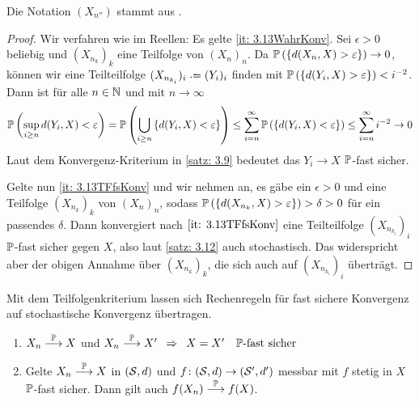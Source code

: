 Die Notation $(X_{n''})$ stammt aus \cite{billingsley2008probability}.

\begin{proof}
	Wir verfahren wie im Reellen:
	Es gelte \cref{it: 3.13WahrKonv}. Sei $\epsilon > 0$ beliebig und $(X_{n_k})_k$ eine Teilfolge von $(X_n)_n$.
	Da $\P\brackets{\menge{d(X_n, X) > \epsilon}} \to 0$, können wir eine Teilteilfolge $(X_{n_{k_i}})_i \defeq (Y_i)_i$ finden mit $\P\brackets{\menge{d(Y_i, X) > \epsilon}} < i^{-2}$. Dann ist für alle $n \in \N$ und mit $n \to \infty$
	\begin{align*}
		\P\brackets{\sup_{i \ge n} d(Y_i, X) < \epsilon}
		= \P\brackets{\bigcup_{i \ge n} \menge{d(Y_i, X) < \epsilon}}
		\leq \sum_{i = n}^{\infty} \P\brackets{\menge{d(Y_i, X) < \epsilon}}
		\leq \sum_{i = n}^{\infty} i^{-2} \to 0 
	\end{align*}
	Laut dem Konvergenz-Kriterium in \cref{satz: 3.9} bedeutet das $Y_i \to X$ $\P$-fast sicher.

	Gelte nun \cref{it: 3.13TFfsKonv} und wir nehmen an, es gäbe ein $\epsilon > 0$ und eine Teilfolge $(X_{n_k})_k$ von $(X_n)_n$, sodass $\P\brackets{\menge{d(X_{n_k}, X) > \epsilon}} > \delta > 0$ für ein passendes $\delta$.
	Dann konvergiert nach $\cref{it: 3.13TFfsKonv}$ eine Teilteilfolge $(X_{n_{k_i}})_i$ $\P$-fast sicher gegen $X$, also laut \cref{satz: 3.12} auch stochastisch. 
	Das widerspricht aber der obigen Annahme über $(X_{n_k})_k$, die sich
	auch auf $(X_{n_{k_i}})_i$ überträgt.
\end{proof}

Mit dem Teilfolgenkriterium lassen sich Rechenregeln für fast sichere Konvergenz auf stochastische Konvergenz übertragen.

\begin{korollar} \label{korollar: 3.14}
	\begin{enumerate}[label=(\alph*)]
		\item \label{it: 3.14probConvEq} $X_n \probto X$ und $X_n \probto X'
			\follows X = X'\quad\P\text{-fast sicher}$
		\item \label{it: 3.14probConvCont} Gelte $X_n \probto X$ in $(\S,d)$ und $f \colon (\S,d) \to (\S',d')$ messbar mit $f$ stetig in $X$ $\P$-fast sicher. Dann gilt auch $f(X_n) \probto f(X)$.
	\end{enumerate}
\end{korollar}

